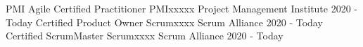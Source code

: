 

\begin{cvhonors}

  \cvhonor
    {PMI Agile Certified Practitioner} %
    {PMIxxxxx} %
    {Project Management Institute} %
    {2020 - Today} %
\cvhonor
    {Certified Product Owner} %
    {Scrumxxxx} %
    {Scrum Alliance} %
    {2020 - Today} %
\cvhonor
    {Certified ScrumMaster} %
    {Scrumxxxx} %
    {Scrum Alliance} %
    {2020 - Today} %
\end{cvhonors}
